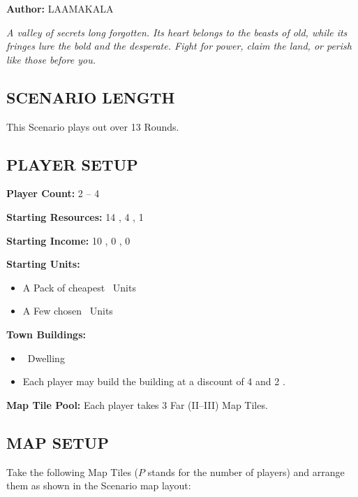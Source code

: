 
\begin{multicols*}{2}

\textbf{Author:} LAAMAKALA

\textit{A valley of secrets long forgotten. Its heart belongs to the beasts of old, while its fringes lure the bold and the desperate. Fight for power, claim the land, or perish like those before you.}

\subsection*{\MakeUppercase{Scenario Length}}
This Scenario plays out over 13 Rounds.

\subsection*{\MakeUppercase{Player Setup}}
\textbf{Player Count:} 2 -- 4

\textbf{Starting Resources:} 14 , 4 , 1 

\textbf{Starting Income:} 10 , 0 , 0 

\textbf{Starting Units:}

\begin{itemize}
  \item A Pack of cheapest \bronze\ Units
  \item A Few chosen \bronze\ Units
\end{itemize}

\textbf{Town Buildings:}
\begin{itemize}
  \item \bronze\ Dwelling
  \item Each player may build the  building at a discount of 4  and 2 .
\end{itemize}

\textbf{Map Tile Pool:} Each player takes 3 Far (II–III) Map Tiles.

\subsection*{\MakeUppercase{Map Setup}}
Take the following Map Tiles ($P$ stands for the number of players) and arrange them as shown in the Scenario map layout:


\end{multicols*}
